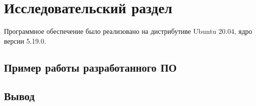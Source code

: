 \chapter{Исследовательский раздел}
\label{cha:research}

Программное обеспечение было реализовано на дистрибутиве Ubuntu 20.04, ядро версии 5.19.0.

\section{Пример работы разработанного ПО}



\section*{Вывод}



